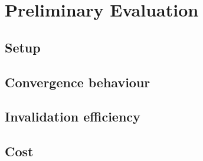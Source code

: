 \section{Preliminary Evaluation}
\label{sec:eval}


\subsection{Setup}

\subsection{Convergence behaviour}

\subsection{Invalidation efficiency}

\subsection{Cost}

